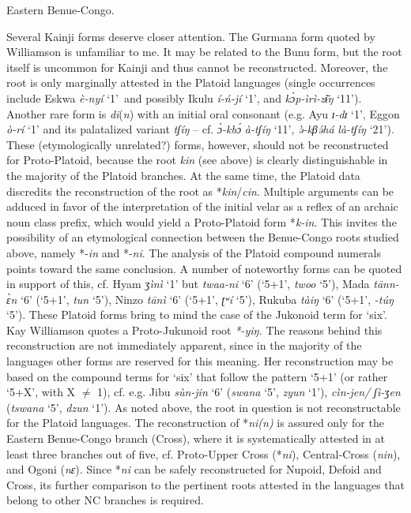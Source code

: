 Eastern Benue-Congo.

Several Kainji forms deserve closer attention. The Gurmana form quoted by Williamson is unfamiliar to me. It may be related to the Bunu form, but the root itself is uncommon for Kainji and thus cannot be reconstructed. Moreover, the root is only marginally attested in the Platoid languages (single occurrences include Eskwa \textit{è-nyí} ‘1’~and possibly Ikulu \textit{í-ń-jí} ‘1’, and \textit{k{\`{ɔ}}p-ìrì-z{\={ɨ}}ŋ} ‘11’). Another rare form is \textit{di}(\textit{n}) with an initial oral consonant (e.g. Ayu \textit{ɪ-dɪ} ‘1’, Eggon \textit{ò-rí} ‘1’ and its palatalized variant \textit{tʃíŋ} – cf. \textit{{\`{ɔ}}-kb{\'{ɔ}}} \textit{à-tʃíŋ} ‘11’, \textit{{\`{ə}}-kβ}\textit{{\'{ə}}há} \textit{là-tʃíŋ} ‘21’). These (etymologically unrelated?) forms, however, should not be reconstructed for Proto-Platoid, because the root \textit{kin} (see above) is clearly distinguishable in the majority of the Platoid branches. At the same time, the Platoid data discredits the reconstruction of the root as *\textit{kin}/\textit{cin}. Multiple arguments can be adduced in favor of the interpretation of the initial velar as a reflex of an archaic noun class prefix, which would yield a Proto-Platoid form *\textit{k-in}. This invites the possibility of an etymological connection between the Benue-Congo roots studied above, namely *-\textit{in} and *-\textit{ni}. The analysis of the Platoid compound numerals points toward the same conclusion. A number of noteworthy forms can be quoted in support of this, cf.  Hyam \textit{ʒìnì} ‘1’ but \textit{twaa-ni} ‘6’ (‘5+1’, \textit{twoo} ‘5’), Mada \textit{t{\={a}}nn-{\`{ɛ}}n} ‘6’ (‘5+1’, \textit{tun} ‘5’), Ninzo \textit{t{\={a}}nì} ‘6’ (‘5+1’, \textit{ʈʷí} ‘5’), Rukuba \textit{tàiŋ} ‘6’ (‘5+1’, \textit{-t{\'{u}}ŋ} ‘5’). These Platoid forms bring to mind the case of the Jukonoid term for ‘six’. Kay Williamson quotes a Proto-Jukunoid root \textit{*-yiŋ.} The reasons behind this reconstruction are not immediately apparent, since in the majority of the languages other forms are reserved for this meaning. Her reconstruction may be based on the compound terms for ‘six’ that follow the pattern ‘5+1’ (or rather ‘5+X’, with X ${\neq}$ 1), cf. e.g. Jibu \textit{sùn-jin} ‘6’ (\textit{swana} ‘5’, \textit{zyun} ‘1’), \textit{cìn-jen/} \textit{ʃì-ʒen} (\textit{tswana} ‘5’, \textit{dzun} ‘1’). As noted above, the root in question is not reconstructable for the Platoid languages. The reconstruction of *\textit{ni(n)} is assured only for the Eastern Benue-Congo branch (Cross), where it is systematically attested in at least three branches out of five, cf. Proto-Upper Cross (*\textit{ni}), Central-Cross (\textit{nin}), and Ogoni (\textit{nɛ}). Since *\textit{ni} can be safely reconstructed for Nupoid, Defoid and Cross, its further comparison to the pertinent roots attested in the languages that belong to other NC branches is required.

